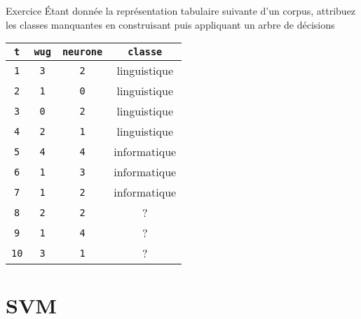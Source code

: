 \documentclass[hyperref={unicode}, xcolor={svgnames}, french]{beamer}
\title{\titlepagetitle}
\subtitle{\titlepagesubtitle}
\author{\textbf{\myname} (\mylab)}
\institute{}
\date{\tiny Version {\yyyymmdddate\today}T\currenttime}
\begin{document}

\begin{frame}[plain]
	\titlepage
\end{frame}

\begin{frame}[fragile=singleslide]{Exercice}
	Étant donnée la représentation tabulaire suivante d'un corpus, attribuez les classes manquantes en construisant puis appliquant un arbre de décisions
	\begin{table}
		\begin{tabu} to .9
			\texttt{t}  & \texttt{wug} & \texttt{neurone} & \texttt{classe}\\
			\hline
			\texttt{1}  & \texttt{3}      & \texttt{2}	& linguistique\\
			\texttt{2}  & \texttt{1}      & \texttt{0}	& linguistique\\
			\texttt{3}  & \texttt{0}      & \texttt{2}	& linguistique\\
			\texttt{4}  & \texttt{2}      & \texttt{1}	& linguistique\\
			\texttt{5}  & \texttt{4}      & \texttt{4}	& informatique\\
			\texttt{6}  & \texttt{1}      & \texttt{3}	& informatique\\
			\texttt{7}  & \texttt{1}      & \texttt{2}	& informatique\\
			\texttt{8}  & \texttt{2}      & \texttt{2}	& ?\\
			\texttt{9}  & \texttt{1}      & \texttt{4}	& ?\\
			\texttt{10}  & \texttt{3}      & \texttt{1}	& ?\\
		\end{tabu}
	\end{table}
\end{frame}


\section{SVM}
\end{document}

